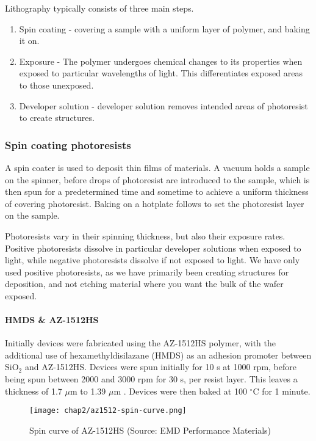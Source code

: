 \documentclass[../../Matt_Gebert_Honours_Thesis.tex]{subfiles}
\begin{document}
	Lithography typically consists of three main steps.
	\begin{enumerate}
		\itemsep0em
		\item Spin coating - covering a sample with a uniform layer of polymer, and baking it on.
		\item Exposure - The polymer undergoes chemical changes to its properties when exposed to particular wavelengths of light. This differentiates exposed areas to those unexposed.
		\item Developer solution - developer solution removes intended areas of photoresist to create structures.
	\end{enumerate}
	
	\subsubsection{Spin coating photoresists}\label{sec:resists}
	A spin coater is used to deposit thin films of materials. A vacuum holds a sample on the spinner, before drops of photoresist are introduced to the sample, which is then spun for a predetermined time and  sometime to achieve a uniform thickness of covering photoresist. Baking on a hotplate follows to set the photoresist layer on the sample.
	
	Photoresists vary in their spinning thickness, but also their exposure rates. Positive photoresists dissolve in particular developer solutions when exposed to light, while negative photoresists dissolve if not exposed to light. We have only used positive photoresists, as we have primarily been creating structures for deposition, and not etching material where you want the bulk of the wafer exposed.
	
	\paragraph{HMDS \& AZ-1512HS}
	Initially devices were fabricated using the AZ-1512HS polymer, with the additional use of hexamethyldisilazane (HMDS) as an adhesion promoter between SiO$_2$ and AZ-1512HS. Devices were spun initially for 10 s at 1000 rpm, before being spun between 2000 and 3000 rpm for 30 s, per resist layer. This leaves a thickness of 1.7 $\mu$m to 1.39 $\mu$m \cite{az1500_series}.
	Devices were then baked at 100 $^\circ$C for 1 minute.
	
	\begin{figure}[H]\label{fig:spin_curve_AZ-1512HS}
		\centering
		\texttt{[image: chap2/az1512-spin-curve.png]}
		\caption[Spin curve of AZ-1512HS]{Spin curve of AZ-1512HS (Source: EMD Performance Materials\cite{az1500_series_spincurve})}
	\end{figure}
	
\end{document}
